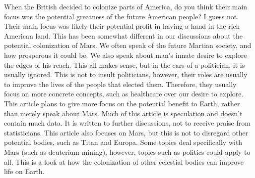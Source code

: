 \documentclass[main.tex]{subfiles}
\begin{document}
When the British decided to colonize parts of America, do you think their main focus was the potential greatness of the future American people? I guess not. Their main focus was likely their potential profit in having a hand in the rich American land. This has been somewhat different in our discussions about the potential colonization of Mars. We often speak of the future Martian society, and how prosperous it could be. We also speak about man's innate desire to explore the edges of his reach. This all makes sense, but in the ears of a politician, it is usually ignored. This is not to insult politicians, however, their roles are usually to improve the lives of the people that elected them. Therefore, they usually focus on more concrete concepts, such as healthcare over our desire to explore. This article plans to give more focus on the potential benefit to Earth, rather than merely speak about Mars. Much of this article is speculation and doesn't contain much data. It is written to further discussions, not to receive praise from statisticians. This article also focuses on Mars, but this is not to disregard other potential bodies, such as Titan and Europa. Some topics deal specifically with Mars (such as deuterium mining), however, topics such as politics could apply to all. This is a look at how the colonization of other celestial bodies can improve life on Earth.
\end{document}
